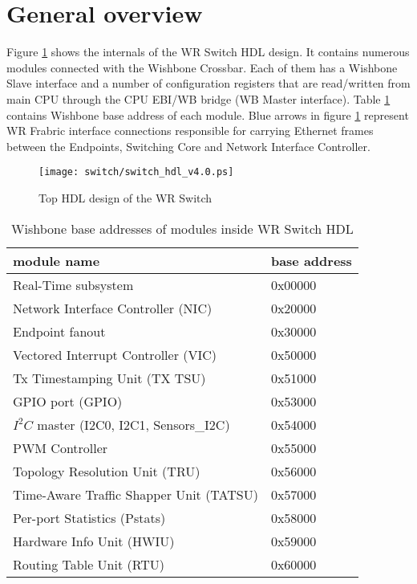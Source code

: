 \section{General overview}

Figure \ref{fig:switch_top} shows the internals of the WR Switch HDL
design. It contains numerous modules connected with the Wishbone Crossbar.
Each of them has a Wishbone Slave interface and a number of configuration
registers that are read/written from main CPU through the CPU EBI/WB bridge (WB
Master interface). Table \ref{tab:gov:wb_base} contains Wishbone base address of
each module. Blue arrows
in figure \ref{fig:switch_top} represent WR Frabric interface connections
responsible for carrying Ethernet frames between the Endpoints, Switching Core
and Network Interface \linebreak Controller.

\begin{figure}[ht]
  \begin{center}
    \texttt{[image: switch/switch\_hdl\_v4.0.ps]}
    \caption{Top HDL design of the WR Switch}
    \label{fig:switch_top}
  \end{center}
\end{figure}

\begin{table}
  \begin{center}
  \begin{tabular}{|l|l|}
    \hline
    module name & base address\\
    \hline \hline
    Real-Time subsystem & 0x00000\\
    Network Interface Controller (NIC) & 0x20000\\
    Endpoint fanout & 0x30000\\
    Vectored Interrupt Controller (VIC) & 0x50000\\
    Tx Timestamping Unit (TX TSU) & 0x51000\\
    GPIO port (GPIO)  & 0x53000\\
    $I^2C$ master (I2C0, I2C1, Sensors\_I2C) & 0x54000\\
    PWM Controller & 0x55000\\
    Topology Resolution Unit (TRU) & 0x56000\\
    Time-Aware Traffic Shapper Unit (TATSU) & 0x57000\\
    Per-port Statistics (Pstats) & 0x58000\\
    Hardware Info Unit (HWIU) & 0x59000\\
    Routing Table Unit (RTU) & 0x60000\\
    \hline
  \end{tabular}
  \caption{Wishbone base addresses of modules inside WR Switch HDL}
  \label{tab:gov:wb_base}
  \end{center}
\end{table}
